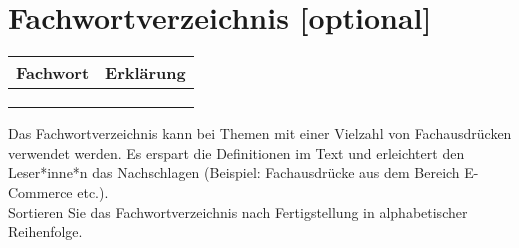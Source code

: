 \chapter{Fachwortverzeichnis [optional]}
\label{sec: Fachwort}

\begin{table}[h]
	\centering
	\begin{tabular}{|p{3cm}|p{11.6cm}|}
		\hline
		\rowcolor{lightgray}\textbf{Fachwort} & \textbf{Erklärung} \\
		\hline
		 & \\ 
		\hline
		 & \\ 
		\hline
		 & \\ 
		\hline
	\end{tabular}
\end{table}

\noindent Das Fachwortverzeichnis kann bei Themen mit einer Vielzahl von Fachausdrücken verwendet werden. Es erspart die Definitionen im Text und erleichtert den Leser*inne*n das Nachschlagen (Beispiel: Fachausdrücke aus dem Bereich E-Commerce etc.).\\
Sortieren Sie das Fachwortverzeichnis nach Fertigstellung in alphabetischer Reihenfolge.
